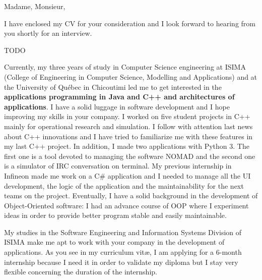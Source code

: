 
\date{\today}
\opening{Madame, Monsieur,}
\closing{I have enclosed my CV for your consideration and I look forward to hearing from you shortly for an interview.}

\makelettertitle

\introduce{}
TODO

Currently, my three years of study in Computer Science engineering at ISIMA (College of Engineering in Computer Science, Modelling and Applications) and at the University of Québec in Chicoutimi led me to get interested in the \textbf{applications programming in Java and C++ and architectures of applications}. I have a solid luggage in software development and I hope improving my skills in your company. I worked on five student projects in C++ mainly for operational research and simulation. I follow with attention last news about C++ innovations and I have tried to familiarize me with these features in my last C++ project. In addition, I made two applications with Python 3. The first one is a tool devoted to managing the software NOMAD and the second one is a simulator of IRC conversation on terminal. My previous internship in Infineon made me work on a C\# application and I needed to manage all the UI development, the logic of the application and the maintainability for the next teams on the project. Eventually, I have a solid background in the development of Object-Oriented software: I had an advance course of OOP where I experiment ideas in order to provide better program stable and easily maintainable.

My studies in the Software Engineering and Information Systems Division of ISIMA make me apt to work with your company in the development of applications. As you see in my curriculum vit\ae{}, I am applying for a 6-month internship because I need it in order to validate my diploma but I stay very flexible concerning the duration of the internship. \conclude{}

\makeletterclosing

